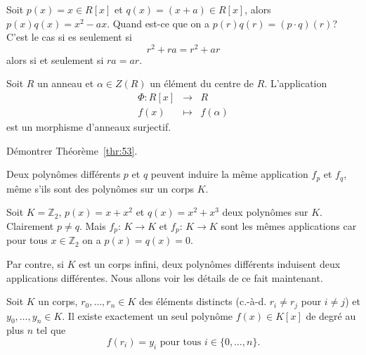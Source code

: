 \begin{example}
  \label{exe:43}
  Soit $p(x) = x ∈ R[x]$ et $q(x) = (x + a) ∈ R[x]$, alors $p(x) q(x) = x^2 - ax$. Quand est-ce que on a $p(r) q(r) = (p ⋅q)(r)$? C'est le cas si es seulement si
  \begin{displaymath}
     r^2 + r a = r^2 + a r  
   \end{displaymath}
   alors si et seulement si $ra = ar$. 
\end{example}


\begin{theorem}
  \label{thr:53}
  Soit $R$ un anneau et $\alpha \in Z(R)$ un élément du centre de $R$. L'application 
  \begin{displaymath}   
    \begin{array}{rcl}
    \Phi \colon R[x] &\rightarrow & R \\
           f(x) &\mapsto &f(\alpha)          
    \end{array}
  \end{displaymath}
est un morphisme d'anneaux surjectif. 
\end{theorem}


\begin{exercise}
  \label{exe:44}
  Démontrer Théorème~\ref{thr:53}. 
\end{exercise}

Deux polynômes différents $p$ et $q$ peuvent induire la même application $f_p$ et $f_q$, même s'ils sont des polynômes sur un corps $K$.

\begin{example}
  \label{exe:36}
  Soit $K = ℤ_2$, $p(x) = x + x^2 $ et $q(x) = x^2 + x^3$ deux
  polynômes sur $K$. Clairement $p ≠ q$. Mais $f_p:\, K →K$ et
  $f_p:\, K →K$ sont les mêmes applications car pour tous
  $x ∈ℤ_2$ on a $p(x) = q(x) = 0$.
\end{example}

Par contre, si $K$ est un corps infini, deux polynômes différents induisent deux applications différentes. Nous allons voir les détails de ce fait maintenant.

\begin{theorem}
  \label{thr:52}
  Soit $K$ un corps, $r_0,\dots,r_n ∈K$ des éléments distincts (c.-à-d. $r_i ≠ r_j$ pour $i≠j$) et $y_0,\dots,y_n ∈K$. Il existe  exactement un seul polynôme $f(x) ∈ K[x]$ de degré au plus $n$ tel que
  \begin{displaymath}
    f(r_i) = y_i \text{ pour tous } i ∈ \{0,\dots,n\}. 
  \end{displaymath}
\end{theorem}

